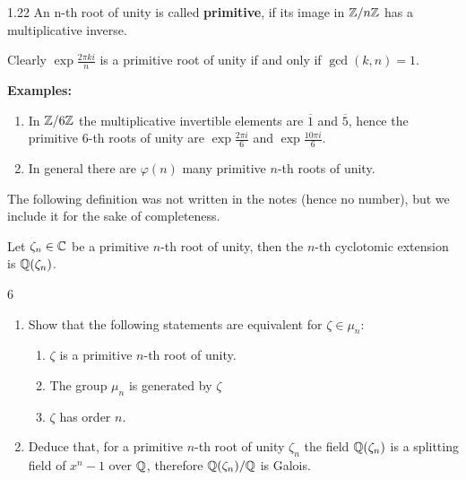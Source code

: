 \documentclass[twoside = false,	%
		headsepline,		%
		parskip = true,
		]{scrbook}						%
\begin{document}
        \begin{definition}{}{1.22}
            An n-th root of unity is called \textbf{primitive}, if its image in $\mathbb Z/n\mathbb Z$ has a multiplicative inverse.
        \end{definition}
        Clearly $\exp{\frac{2 \pi k i}{n}}$ is a primitive root of unity if and only if $\gcd(k,n) = 1$.
        
        \textbf{Examples:}
        \begin{enumerate}
            \item In $\mathbb Z/6\mathbb Z$ the multiplicative invertible elements are $\overline{1}$ and $\overline{5}$, hence the primitive $6$-th roots of unity are $\exp{\frac{2 \pi i}{6}}$ and $\exp{\frac{10 \pi i}{6}}$.
            \item In general there are $\varphi(n)$ many primitive $n$-th roots of unity.
        \end{enumerate}
        
        The following definition was not written in the notes (hence no number), but we include it for the sake of completeness.
        
        \begin{definition*}{}{}
            Let $\zeta_n \in \mathbb C$ be a primitive $n$-th root of unity, then the $n$-th cyclotomic extension is $\mathbb Q(\zeta_n)$.
        \end{definition*}
        
        \begin{exercise}{}{6}
            \begin{enumerate}
                \item Show that the following statements are equivalent for $\zeta \in \mu_n$:
                \begin{enumerate}
                    \item $\zeta$ is a primitive $n$-th root of unity.
                    \item The group $\mu_n$ is generated by $\zeta$
                    \item $\zeta$ has order $n$.
                \end{enumerate}
                \item Deduce that, for a primitive $n$-th root of unity $\zeta_n$ the field $\mathbb Q(\zeta_n)$ is a splitting field of $x^n - 1$ over $\mathbb Q$, therefore $\mathbb Q(\zeta_n)/\mathbb Q$ is Galois.
            \end{enumerate}
        \end{exercise}
        
\end{document}
